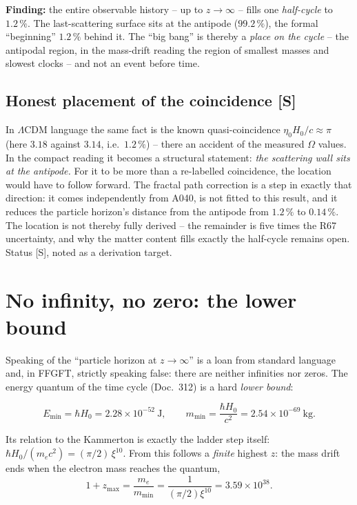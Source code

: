 \textbf{Finding:} the entire observable history -- up to
$z \to \infty$ -- fills one \emph{half-cycle} to $1.2\,\%$. The
last-scattering surface sits at the antipode ($99.2\,\%$), the
formal \enquote{beginning} $1.2\,\%$ behind it. The
\enquote{big bang} is thereby a \emph{place on the cycle} -- the
antipodal region, in the mass-drift reading the region of smallest
masses and slowest clocks -- and not an event before time.

\section{Honest placement of the coincidence [S]}

In $\Lambda$CDM language the same fact is the known
quasi-coincidence $\eta_0 H_0/c \approx \pi$ (here $3.18$ against
$3.14$, i.e.\ $1.2\,\%$) -- there an accident of the measured
$\Omega$ values. In the compact reading it becomes a structural
statement: \emph{the scattering wall sits at the antipode.} For it
to be more than a re-labelled coincidence, the location would have
to follow forward. The fractal path correction is a step in
exactly that direction: it comes independently from A040, is not
fitted to this result, and it reduces the particle horizon's distance
from the antipode from $1.2\,\%$ to $0.14\,\%$. The location is
not thereby fully derived -- the remainder is five times the R67
uncertainty, and why the matter content fills exactly the
half-cycle remains open. Status [S], noted as a derivation
target.

\chapter{No infinity, no zero: the lower bound}

Speaking of the \enquote{particle horizon at $z\to\infty$} is a
loan from standard language and, in FFGFT, strictly speaking
false: there are neither infinities nor zeros. The energy quantum
of the time cycle (Doc.~312) is a hard \emph{lower bound}:

\begin{equation}
  E_\text{min} = \hbar H_0 = 2.28\times10^{-52}~\text{J},
  \qquad
  m_\text{min} = \frac{\hbar H_0}{c^2}
  = 2.54\times10^{-69}~\text{kg}.
\end{equation}

Its relation to the Kammerton is exactly the ladder step itself:
$\hbar H_0/(m_ec^2) = (\pi/2)\,\xi^{10}$. From this follows a
\emph{finite} highest $z$: the mass drift ends when the electron
mass reaches the quantum,
\begin{equation}
  1+z_\text{max} = \frac{m_e}{m_\text{min}}
  = \frac{1}{(\pi/2)\xi^{10}} = 3.59\times10^{38}.
\end{equation}

